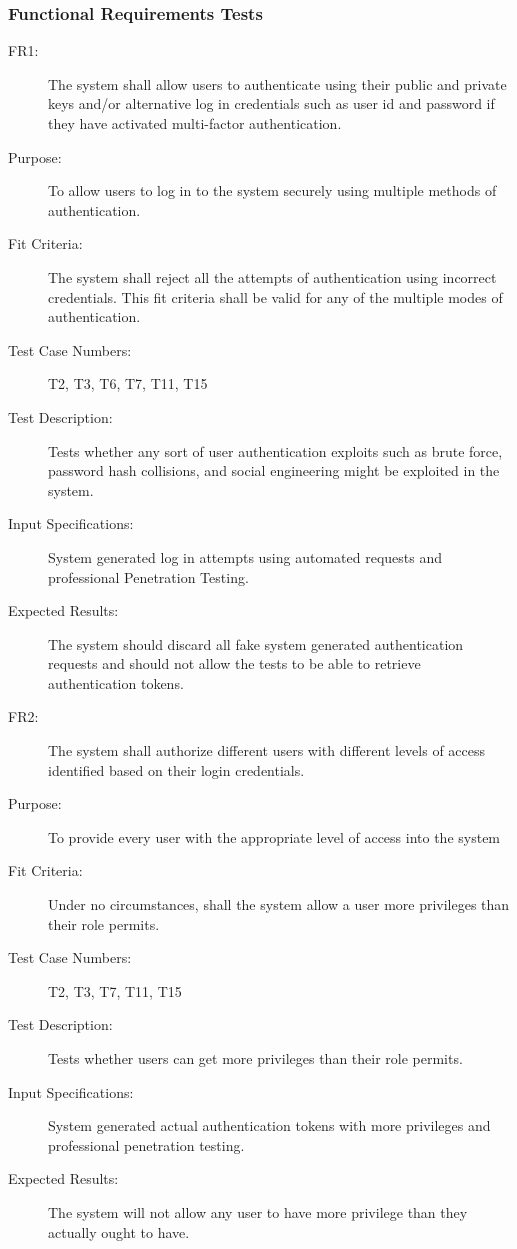 \documentclass[a4paper,twoside,phd]{BYUPhys}
\begin{document}
\subsubsection{Functional Requirements Tests}
\begin{description}
\item[FR1:] The system shall allow users to authenticate using their public and private keys and/or alternative log in credentials such as user id and password if they have activated multi-factor authentication.
\item[Purpose:] To allow users to log in to the system securely using multiple methods of authentication.
\item[Fit Criteria:] The system shall reject all the attempts of authentication using incorrect credentials. This fit criteria shall be valid for any of the multiple modes of authentication.
\item[Test Case Numbers:] T2, T3, T6, T7, T11, T15
\item[Test Description:] Tests whether any sort of user authentication exploits such as brute force, password hash collisions, and social engineering might be exploited in the system.
\item[Input Specifications:] System generated log in attempts using automated requests and professional Penetration Testing.
\item[Expected Results:] The system should discard all fake system generated authentication requests and should not allow the tests to be able to retrieve authentication tokens.
\\
\item[FR2:] The system shall authorize different users with different levels of access identified based on their login credentials.
\item[Purpose:] To provide every user with the appropriate level of access into the system
\item[Fit Criteria:] Under no circumstances, shall the system allow a user more privileges than their role permits.
\item[Test Case Numbers:] T2, T3, T7, T11, T15
\item[Test Description:] Tests whether users can get more privileges than their role permits.
\item[Input Specifications:] System generated actual authentication tokens with more privileges and professional penetration testing.
\item[Expected Results:] The system will not allow any user to have more privilege than they actually ought to have.

\end{description}
\end{document}
